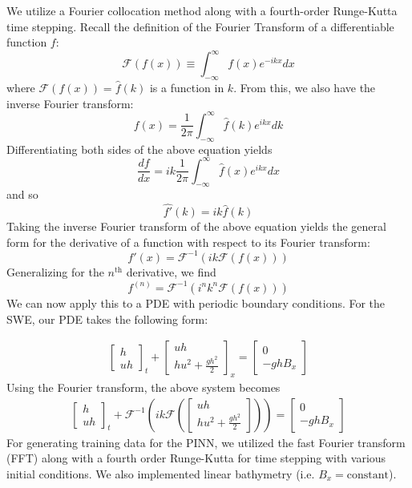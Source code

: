 We utilize a Fourier collocation method along with a fourth-order Runge-Kutta time stepping. 
Recall the definition of the Fourier Transform of a differentiable function $f$:
\[\mathcal{F}(f(x)) \equiv \int_{-\infty}^{\infty}f(x)e^{-ikx}dx\]
where $\mathcal{F}(f(x)) = \hat{f}(k)$ is a function in $k$. From this, we also have the inverse Fourier transform:
\[f(x) = \frac{1}{2\pi}\int_{-\infty}^{\infty} \hat{f}(k)e^{ikx}dk\]
Differentiating both sides of the above equation yields
\[\frac{df}{dx} = ik\frac{1}{2\pi}\int_{-\infty}^{\infty}\hat{f}(x)e^{ikx}dx\]
and so
\[\hat{f'}(k) = ik\hat{f}(k)\]
Taking the inverse Fourier transform of the above equation yields the general form for the derivative of a function with respect to its Fourier transform:
\[f'(x) = \mathcal{F}^{-1}(ik\mathcal{F}(f(x)))\]
Generalizing for the $n^{\text{th}}$ derivative, we find
\[f^{(n)} = \mathcal{F}^{-1}(i^nk^n\mathcal{F}(f(x)))\]
We can now apply this to a PDE with periodic boundary conditions. For the SWE, our PDE takes the following form:

\begin{align*}
    \begin{bmatrix}
        h\\
        uh
    \end{bmatrix}_t
    + 
    \begin{bmatrix}
        uh\\
        hu^2 + \frac{gh^2}{2}
    \end{bmatrix}_x
    =
    \begin{bmatrix}
        0\\
        -ghB_x
    \end{bmatrix}
\end{align*}    
Using the Fourier transform, the above system becomes
\begin{align*}
    \begin{bmatrix}
        h\\
        uh
    \end{bmatrix}_t
    + 
    \mathcal{F}^{-1}\left(ik\mathcal{F}\left(\begin{bmatrix}
        uh\\
        hu^2 + \frac{gh^2}{2}
    \end{bmatrix} \right)\right)
    = 
    \begin{bmatrix}
        0\\
        -ghB_x
    \end{bmatrix}
\end{align*}
For generating training data for the PINN, we utilized the fast Fourier transform (FFT) along with a fourth order Runge-Kutta for time stepping with various initial conditions. We also implemented linear bathymetry (i.e. $B_x = \text{constant}$).
\newline\newline

